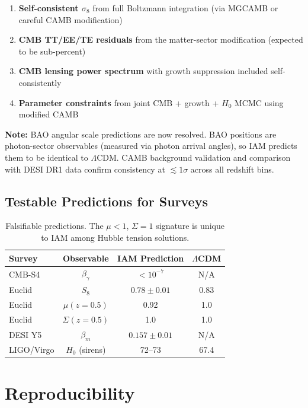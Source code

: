 \documentclass[11pt,letterpaper]{article}
\begin{document}
\begin{enumerate}
\item \textbf{Self-consistent $\sigma_8$} from full Boltzmann integration (via MGCAMB or careful CAMB modification)
\item \textbf{CMB TT/EE/TE residuals} from the matter-sector modification (expected to be sub-percent)
\item \textbf{CMB lensing power spectrum} with growth suppression included self-consistently
\item \textbf{Parameter constraints} from joint CMB + growth + $H_0$ MCMC using modified CAMB
\end{enumerate}

\noindent\textbf{Note:} BAO angular scale predictions are now resolved. BAO positions are photon-sector observables (measured via photon arrival angles), so IAM predicts them to be identical to $\Lambda$CDM. CAMB background validation and comparison with DESI DR1 data confirm consistency at $\lesssim 1\sigma$ across all redshift bins.

\subsection{Testable Predictions for Surveys}

\begin{table}[h]
\centering
\begin{tabular}{lccc}
\toprule
Survey & Observable & IAM Prediction & $\Lambda$CDM \\
\midrule
CMB-S4 & $\beta_\gamma$ & $< 10^{-7}$ & N/A \\
Euclid & $S_8$ & $0.78 \pm 0.01$ & 0.83 \\
Euclid & $\mu(z=0.5)$ & 0.92 & 1.0 \\
Euclid & $\Sigma(z=0.5)$ & 1.0 & 1.0 \\
DESI Y5 & $\beta_m$ & $0.157 \pm 0.01$ & N/A \\
LIGO/Virgo & $H_0$ (sirens) & 72--73 & 67.4 \\
\bottomrule
\end{tabular}
\caption{Falsifiable predictions. The $\mu < 1$, $\Sigma = 1$ signature is unique to IAM among Hubble tension solutions.}
\end{table}

\section{Reproducibility}
\end{document}
